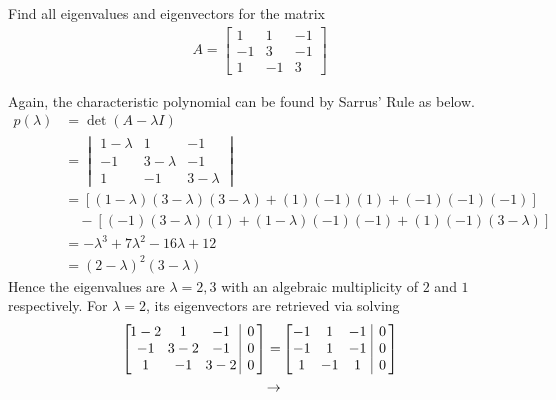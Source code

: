 \begin{exmp}
\label{exmp:2geomul}
Find all eigenvalues and eigenvectors for the matrix
\begin{align*}
A = \begin{bmatrix}
1 & 1 & -1 \\
-1 & 3 & -1 \\
1 & -1 & 3
\end{bmatrix}
\end{align*}
\end{exmp}
\begin{solution}
Again, the characteristic polynomial can be found by Sarrus' Rule as below.
\begin{align*}
p(\lambda) &= \det(A-\lambda I) \\
&= \begin{vmatrix}
1-\lambda & 1 & -1 \\
-1 & 3-\lambda & -1 \\
1 & -1 & 3-\lambda
\end{vmatrix} \\
&= [(1-\lambda)(3-\lambda)(3-\lambda) + (1)(-1)(1) + (-1)(-1)(-1)] \\
&\quad - [(-1)(3-\lambda)(1) + (1-\lambda)(-1)(-1) + (1)(-1)(3-\lambda)]\\
&= -\lambda^3 + 7\lambda^2 - 16\lambda + 12 \\
&= (2-\lambda)^2(3-\lambda)
\end{align*}
Hence the eigenvalues are $\lambda = 2,3$ with an algebraic multiplicity of $2$ and $1$ respectively. For $\lambda = 2$, its eigenvectors are retrieved via solving
\begin{align*}
\left[\begin{array}{@{\,}wc{17pt}wc{17pt}wc{17pt}|c@{\,}}
1-2 & 1 & -1 & 0 \\
-1 & 3-2 & -1 & 0 \\
1 & -1 & 3-2 & 0
\end{array}\right]
=& 
\left[\begin{array}{@{\,}wc{10pt}wc{10pt}wc{10pt}|c@{\,}}
-1 & 1 & -1 & 0 \\
-1 & 1 & -1 & 0 \\
1 & -1 & 1 & 0
\end{array}\right] \\ 
\to&

\end{align*}
\end{solution}
